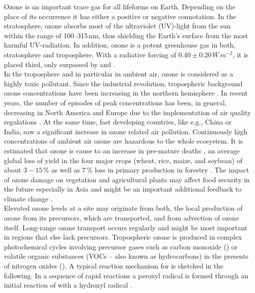 \documentclass[gmd, manuscript]{copernicus}
\begin{document}
\introduction  %
\label{sec:intro}
Ozone is an important trace gas for all lifeforms on Earth. Depending on the place of its occurrence it has either a positive or negative connotation. In the stratosphere, ozone absorbs most of the ultraviolet (UV)-light from the sun within the range of 100--315\,\unit{nm}, thus shielding the Earth's surface from the most harmful UV-radiation. In addition, ozone is a potent greenhouse gas in both, stratosphere and troposphere. With a radiative forcing of $0.40 \pm 0.20\,\unit{W\,m^{-2}}$, it is placed third, only surpassed by  and  \citep[Chapter 8]{IPCC2013}.\\
In the troposphere and in particular in ambient air, ozone is considered as a highly toxic pollutant. Since the industrial revolution, tropospheric background ozone concentrations have been increasing in the northern hemisphere \citep[Chapter 2]{IPCC2013}. In recent years, the number of episodes of peak concentrations has been, in general, decreasing in North America and Europe due to the implementation of air quality regulations \citep[e.g.,][]{ESA:Fleming2018, ESA:Mills2018}. At the same time, fast developing countries, like e.g., China or India, saw a significant increase in ozone related air pollution. Continuously high concentrations of ambient air ozone are hazardous to the whole ecosystem. It is estimated that ozone is cause to an increase in pre-mature deaths \citep{WHO2008}, an average global loss of yield in the four major crops (wheat, rice, maize, and soybean) of about $3-15\,\unit{\%}$ \citep{PJ:Ainsworth2017} as well as $7\,\unit{\%}$ loss in primary production in forestry \citep{GCB:Wittig2009,EP:Matyssek2012}. The impact of ozone damage on vegetation and agricultural plants may affect food security in the future especially in Asia \citep{GCB:Tang2013,NCC:Tai2014,AE:Chuwah2015,GCB:Mills2018} and might be an important additional feedback to climate change \citep{Nat:Sitch2007}.\\
Elevated ozone levels at a site may originate from both, the local production of ozone from its precursors, which are transported, and from advection of ozone itself. Long-range ozone transport occurs regularly and might be most important in regions that else lack precursors. Tropospheric ozone is produced in complex photochemical cycles involving precursor gases such as carbon monoxide () or volatile organic substances (VOCs -- also known as hydrocarbons) in the presents of nitrogen oxides (). A typical reaction mechanism for  is sketched in the following. In a sequence of rapid reactions a peroxyl radical  is formed through an initial reaction of  with a hydroxyl radical .
\end{document}
